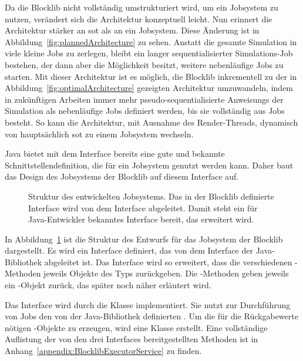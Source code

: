 Da die Blocklib nicht vollständig umstrukturiert wird, um ein Jobsystem zu nutzen, verändert sich die Architektur konzeptuell leicht. Nun erinnert die Architektur stärker an \ac{sot} als an ein Jobsystem. Diese Änderung ist in Abbildung~\ref{fig:plannedArchitecture} zu sehen. Anstatt die gesamte Simulation in viele kleine Jobs zu zerlegen, bleibt ein langer sequentialisierter Simulations-Job bestehen, der dann aber die Möglichkeit besitzt, weitere nebenläufige Jobs zu starten. Mit dieser Architektur ist es möglich, die Blocklib inkrementell zu der in Abbildung~\ref{fig:optimalArchitecture} gezeigten Architektur umzuwandeln, indem in zukünftigen Arbeiten immer mehr pseudo-sequentialisierte \glspl{Anweisung} der Simulation als nebenläufige Jobs definiert werden, bis sie vollständig aus Jobs besteht. So kann die Architektur, mit Ausnahme des Render-Threads, dynamisch von hauptsächlich \ac{sot} zu einem Jobsystem wechseln.

Java bietet mit dem Interface  bereits eine gute und bekannte Schnittstellendefinition, die für ein Jobsystem genutzt werden kann. Daher baut das Design des Jobsystems der Blocklib auf diesem Interface auf. 

\begin{figure}
	
	\caption[Struktur des entwickelten Jobsystems.]{Struktur des entwickelten Jobsystems. Das in der Blocklib definierte Interface wird von dem Interface  abgeleitet. Damit steht ein für Java-Entwickler bekanntes Interface bereit, das erweitert wird.}\label{fig:GrobesDesign}
\end{figure}

In Abbildung~\ref{fig:GrobesDesign} ist die Struktur des Entwurfs für das Jobsystem der Blocklib dargestellt. Es wird ein Interface  definiert, das von dem Interface  der Java-Bibliothek abgeleitet ist. Das Interface wird so erweitert, dass die verschiedenen -Methoden jeweils Objekte des Typs  zurückgeben. Die -Methoden geben jeweils ein -Objekt zurück, das später noch näher erläutert wird.

Das Interface  wird durch die Klasse  implementiert. Sie nutzt zur Durchführung von Jobs den von der Java-Bibliothek definierten . Um die für die Rückgabewerte nötigen -Objekte zu erzeugen, wird eine Klasse  erstellt. Eine vollständige Auflistung der von den drei Interfaces bereitgestellten Methoden ist in Anhang~\ref{appendix:BlocklibExecutorService} zu finden. 

